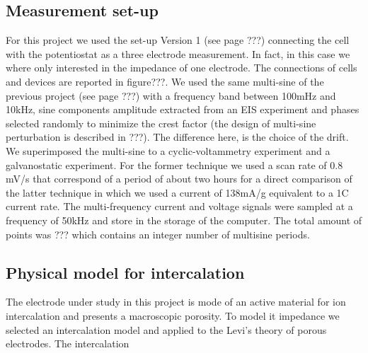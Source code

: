 \subsection{Measurement set-up}
For this project we used the set-up Version 1 (see page ???) connecting the cell with the potentiostat as a three electrode measurement. In fact, in this case we where only interested in the impedance of one electrode. The connections of cells and devices are reported in figure???.
We used the same multi-sine of the previous project (see page ???) with a frequency band between 100mHz and 10kHz, sine components amplitude extracted from an EIS experiment and phases selected randomly to minimize the crest factor (the design of multi-sine perturbation is described in ???). The difference here, is the choice of the drift. We superimposed the multi-sine to a cyclic-voltammetry experiment and a galvanostatic experiment. For the former technique we used a scan rate of 0.8 mV/s that correspond of a period of about two hours for a direct comparison of the latter technique in which we used a current of 138mA/g equivalent to a 1C current rate. The multi-frequency current and voltage signals were sampled at a frequency of 50kHz and store in the storage of the computer. The total amount of points was ??? which contains an integer number of multisine periods.

\subsection{Physical model for intercalation}
The electrode under study in this project is mode of an active material for ion intercalation and presents a macroscopic porosity. To model it impedance we selected an intercalation model and applied to the Levi’s theory of porous electrodes. The intercalation

